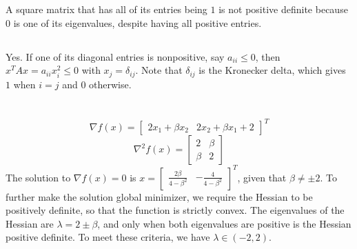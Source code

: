 \documentclass[11pt]{article}
\begin{document}
\section{}
\subsection{}
A square matrix that has all of its entries being $1$ is not positive definite because $0$ is one of its eigenvalues, despite having all positive entries.
\subsection{}
Yes. If one of its diagonal entries is nonpositive, say $a_{ii}\leq0$, then $x^TAx=a_{ii}x_i^2\leq0$ with $x_j=\delta_{ij}$. Note that $\delta_{ij}$ is the Kronecker delta, which gives $1$ when $i=j$ and $0$ otherwise.
\section{}

\section{}
$$\nabla f(x)=\begin{bmatrix}2x_1+\beta x_2 & 2x_2+\beta x_1+2\end{bmatrix}^T$$ $$\nabla^2f(x)=\begin{bmatrix}2 & \beta \\ \beta & 2 \end{bmatrix}$$
The solution to $\nabla f(x)=0$ is $x=\begin{bmatrix} \frac{2\beta}{4-\beta^2} & -\frac{4}{4-\beta^2} \end{bmatrix}^T$, given that $\beta\neq\pm2$. To further make the solution global minimizer, we require the Hessian to be positively definite, so that the function is strictly convex. The eigenvalues of the Hessian are $\lambda=2\pm\beta$, and only when both eigenvalues are positive is the Hessian positive definite. To meet these criteria, we have $\lambda\in(-2,2)$.
\section{}
\end{document}
